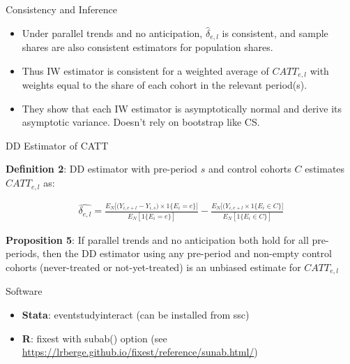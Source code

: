 \documentclass{beamer}
\begin{document}
\begin{frame}{Consistency and Inference}


\begin{itemize}
\item Under parallel trends and no anticipation, $\widehat{\delta}_{e,l}$ is consistent, and sample shares are also consistent estimators for population shares. 
\item Thus IW estimator is consistent for a weighted average of $CATT_{e,l}$ with weights equal to the share of each cohort in the relevant period(s).
\item They show that each IW estimator is asymptotically normal and derive its asymptotic variance. Doesn't rely on bootstrap like CS.
\end{itemize}

\end{frame}

\begin{frame}{DD Estimator of CATT}

\textbf{Definition 2}: DD estimator with pre-period $s$ and control cohorts $C$ estimates $CATT_{e,l}$ as:

\begin{eqnarray*}
\widehat{\delta_{e,l}} = \frac{ E_N \big [ \big ( Y_{i, e+l} - Y_{i,s} \big ) \times 1\{E_i=e\} \big ]}{E_N[1 \{E_i=e\} ]} - \frac{E_N \big [ \big ( Y_{i,e+l} \times 1 \{E_i \in C \} ]}{E_N [1 \{ E_i \in C \}]}
\end{eqnarray*}


\textbf{Proposition 5}: If parallel trends and no anticipation both hold for all pre-periods, then the DD estimator using any pre-period and non-empty control cohorts (never-treated or not-yet-treated) is an unbiased estimate for $CATT_{e,l}$

\end{frame}

\begin{frame}{Software}

\begin{itemize}
\item \textbf{Stata}: eventstudyinteract (can be installed from ssc)
\item \textbf{R}: fixest with subab() option (see \url{https://lrberge.github.io/fixest/reference/sunab.html/})
\end{itemize}


\end{frame}
\end{document}
